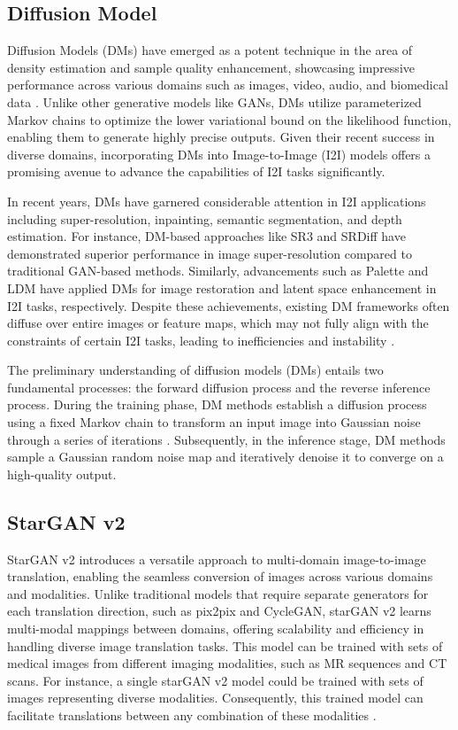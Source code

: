 \documentclass[UKenglish,12pt]{master-style}
\begin{document}
\subsection{Diffusion Model}

Diffusion Models (DMs) have emerged as a potent technique in the area of density estimation and sample quality enhancement, showcasing impressive performance across various domains such as images, video, audio, and biomedical data \cite{DiffI2I}. Unlike other generative models like GANs, DMs utilize parameterized Markov chains to optimize the lower variational bound on the likelihood function, enabling them to generate highly precise outputs. Given their recent success in diverse domains, incorporating DMs into Image-to-Image (I2I) models offers a promising avenue to advance the capabilities of I2I tasks significantly.

In recent years, DMs have garnered considerable attention in I2I applications including super-resolution, inpainting, semantic segmentation, and depth estimation. For instance, DM-based approaches like SR3 and SRDiff have demonstrated superior performance in image super-resolution compared to traditional GAN-based methods. Similarly, advancements such as Palette and LDM have applied DMs for image restoration and latent space enhancement in I2I tasks, respectively. Despite these achievements, existing DM frameworks often diffuse over entire images or feature maps, which may not fully align with the constraints of certain I2I tasks, leading to inefficiencies and instability \cite{DiffI2I}.

The preliminary understanding of diffusion models (DMs) entails two fundamental processes: the forward diffusion process and the reverse inference process. During the training phase, DM methods establish a diffusion process using a fixed Markov chain to transform an input image into Gaussian noise through a series of iterations \cite{DiffI2I}. Subsequently, in the inference stage, DM methods sample a Gaussian random noise map and iteratively denoise it to converge on a high-quality output.

\subsection{StarGAN v2}

StarGAN v2 introduces a versatile approach to multi-domain image-to-image translation, enabling the seamless conversion of images across various domains and modalities. Unlike traditional models that require separate generators for each translation direction, such as pix2pix and CycleGAN, starGAN v2 learns multi-modal mappings between domains, offering scalability and efficiency in handling diverse image translation tasks. This model can be trained with sets of medical images from different imaging modalities, such as MR sequences and CT scans. For instance, a single starGAN v2 model could be trained with sets of images representing diverse modalities. Consequently, this trained model can facilitate translations between any combination of these modalities \cite{Chakraborty_2024} .
\end{document}
